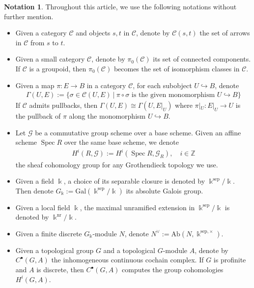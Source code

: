 \documentclass[a4paper]{amsart}
\theoremstyle{definition}
\newtheorem{notation}[thm]{Notation}
\DeclareMathOperator{\Spec}{Spec}
\numberwithin{equation}{section}
\begin{document}
\begin{notation}\label{notation-overall} Throughout this article, we use the following notations without further mention.
\begin{itemize}
    \item Given a category $\mathscr{C}$ and objects $s,t$ in $\mathscr{C}$, denote by $\mathscr{C}(s,t)$ the set of arrows in $\mathscr{C}$ from $s$ to $t$.
    \item Given a small category $\mathscr{C}$, denote by $\pi_0(\mathscr{C})$ its set of connected components. If $\mathscr{C}$ is a groupoid, then $\pi_0(\mathscr{C})$ becomes the set of isomorphism classes in $\mathscr{C}$.
    \item Given a map $\pi:E\rightarrow B$ in a category $\mathscr{C}$, for each subobject $U\hookrightarrow B$, denote
    \begin{align*}
        \Gamma(U,E):=\{\sigma\in\mathscr{C}(U,E)\ |\ \textrm{$\pi\circ\sigma$ is the given monomorphism $U\hookrightarrow B$}\}
    \end{align*}
    If $\mathscr{C}$ admits pullbacks, then $\Gamma(U,E)\cong\Gamma(U,E|_U)$ where $\pi|_U:E|_U\rightarrow U$ is the pullback of $\pi$ along the monomorphism $U\hookrightarrow B$.
    \item Let $\mathcal{G}$ be a commutative group scheme over a base scheme. Given an affine scheme $\Spec R$ over the same base scheme, we denote
    \begin{align*}
        H^i(R,\mathcal{G}):=H^i(\Spec R,\mathcal{G}_R),\quad i\in\mathbb{Z}
    \end{align*}
    the sheaf cohomology group for any Grothendieck topology we use.
    \item Given a field $\Bbbk$, a choice of its separable closure is denoted by $\Bbbk^\mathrm{sep}/\Bbbk$. Then denote $G_\Bbbk:=\mathrm{Gal}(\Bbbk^\mathrm{sep}/\Bbbk)$ its absolute Galois group.
    \item Given a local field $\Bbbk$, the maximal unramified extension in $\Bbbk^\mathrm{sep}/\Bbbk$ is denoted by $\Bbbk^\mathrm{nr}/\Bbbk$.
    \item Given a finite discrete $G_\Bbbk$-module $N$, denote $N^\vee:=\mathrm{Ab}(N,\Bbbk^{\mathrm{sep},\times})$.
    \item  Given a topological group $G$ and a topological $G$-module $A$, denote by $C^\bullet(G,A)$ the inhomogeneous continuous cochain complex. If $G$ is profinite and $A$ is discrete, then $C^\bullet(G,A)$ computes the group cohomologies $H^i(G,A)$. %

\end{itemize}
\end{notation}
\end{document}
